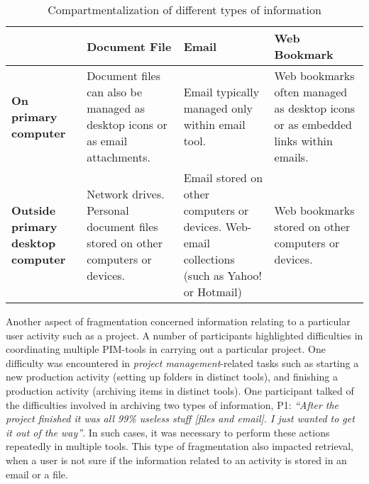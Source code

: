 \begin{table}[hbtp]
\begin{center}
\begin{footnotesize}
\setlength{\extrarowheight}{2pt}
\begin{tabular}{|p{2.5cm}|p{3.5cm}|p{3.5cm}|p{3.5cm}|}
\hline
 & {\bf Document File} & {\bf Email} & {\bf Web Bookmark} \\
\hline
{\bf On primary computer} & Document files can also be managed as desktop icons or as email attachments.  & Email typically managed only within email tool. & Web bookmarks often managed as desktop icons or as embedded links within emails.  \\
\hline
{\bf Outside primary desktop computer} & Network drives. Personal document files stored on other computers or devices. & Email stored on other computers or devices. Web-email collections (such as Yahoo! or Hotmail) & Web bookmarks stored on other computers or devices.  \\
\hline
\end{tabular}  
\end{footnotesize}
\caption{Compartmentalization of different types of information}
\label{table:compartmentalization}
\end{center}
\end{table}
\normalsize

Another aspect of fragmentation concerned information relating to a particular user activity such as a project.  A number of participants highlighted difficulties in coordinating multiple PIM-tools in carrying out a particular project.
One difficulty was encountered in \textit{project management}-related tasks such as starting a new production activity (setting up folders in distinct tools), and finishing a production activity (archiving items in distinct tools).  One participant talked of the difficulties involved in archiving two types of information, P1: \textit{``After the project finished it was all 99\% useless stuff [files and email]. I just wanted to get it out of the way''}. In such cases, it was necessary to perform these actions repeatedly in multiple tools.  This type of fragmentation also impacted retrieval, when a user is not sure if the information related to an activity is stored in an email or a file.

